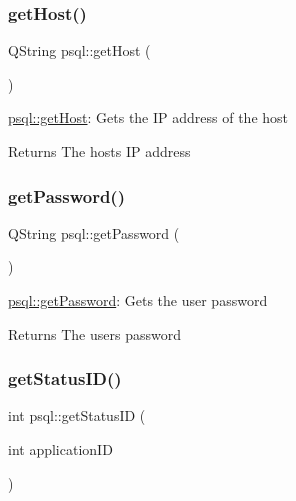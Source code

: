 \subsubsection{\texorpdfstring{get\+Host()}{getHost()}}
{\footnotesize\ttfamily Q\+String psql\+::get\+Host (\begin{DoxyParamCaption}{ }\end{DoxyParamCaption})}



\hyperlink{classpsql_a95d06ee661db0b9cf72605b983b04613}{psql\+::get\+Host}\+: Gets the IP address of the host 

\begin{DoxyReturn}{Returns}
The host\textquotesingle{}s IP address 
\end{DoxyReturn}
\mbox{\label{classpsql_a817e5a88f877cac6f843c1e743aec096}} 
\subsubsection{\texorpdfstring{get\+Password()}{getPassword()}}
{\footnotesize\ttfamily Q\+String psql\+::get\+Password (\begin{DoxyParamCaption}{ }\end{DoxyParamCaption})}



\hyperlink{classpsql_a817e5a88f877cac6f843c1e743aec096}{psql\+::get\+Password}\+: Gets the user password 

\begin{DoxyReturn}{Returns}
The user\textquotesingle{}s password 
\end{DoxyReturn}
\mbox{\label{classpsql_a9c02c92c09cb60c35d24375673b7df06}} 
\subsubsection{\texorpdfstring{get\+Status\+I\+D()}{getStatusID()}}
{\footnotesize\ttfamily int psql\+::get\+Status\+ID (\begin{DoxyParamCaption}\item[{int}]{application\+ID }\end{DoxyParamCaption})}



